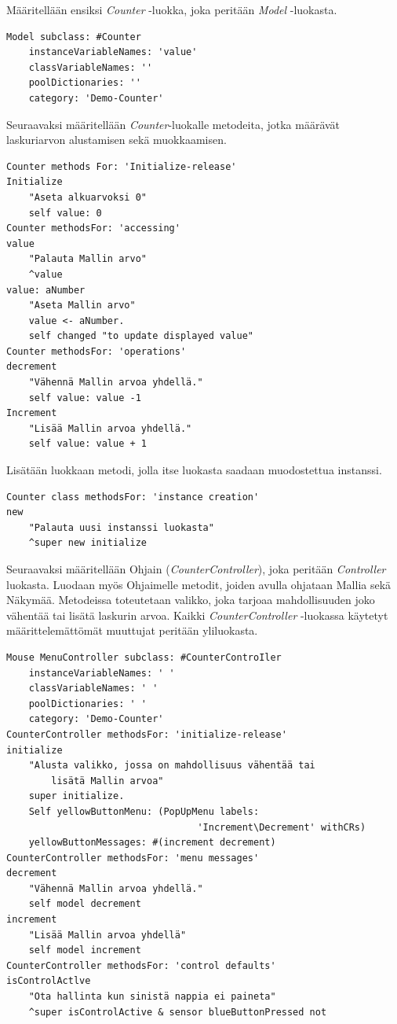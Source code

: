 \documentclass[utf8]{gradu3}
\begin{document}
Määritellään ensiksi \emph{Counter} -luokka, joka peritään \emph{Model} -luokasta.
\begin{lstlisting}[language=Smalltalk]
Model subclass: #Counter
	instanceVariableNames: 'value'
	classVariableNames: ''
	poolDictionaries: ''
  	category: 'Demo-Counter'
\end{lstlisting}
Seuraavaksi määritellään \emph{Counter}-luokalle metodeita, jotka määrävät
laskuriarvon alustamisen sekä muokkaamisen.
\begin{lstlisting}[language=Smalltalk]
Counter methods For: 'Initialize-release'
Initialize
	"Aseta alkuarvoksi 0"
	self value: 0
Counter methodsFor: 'accessing'
value
	"Palauta Mallin arvo"
   	^value
value: aNumber
	"Aseta Mallin arvo"
	value <- aNumber.
	self changed "to update displayed value"
Counter methodsFor: 'operations'
decrement
	"Vähennä Mallin arvoa yhdellä."
	self value: value -1
Increment
	"Lisää Mallin arvoa yhdellä."
	self value: value + 1
\end{lstlisting}
Lisätään luokkaan metodi, jolla itse luokasta saadaan muodostettua instanssi.
\begin{lstlisting}[language=Smalltalk]
Counter class methodsFor: 'instance creation'
new
	"Palauta uusi instanssi luokasta"
	^super new initialize
\end{lstlisting}
Seuraavaksi määritellään Ohjain (\emph{CounterController}), joka peritään
\emph{Controller} luokasta. Luodaan myös Ohjaimelle metodit, joiden avulla
ohjataan Mallia sekä Näkymää. Metodeissa toteutetaan valikko, joka tarjoaa
mahdollisuuden joko vähentää tai lisätä laskurin arvoa. Kaikki \emph{CounterController} -luokassa käytetyt
määrittelemättömät muuttujat peritään yliluokasta.
\begin{lstlisting}[language=Smalltalk]
Mouse MenuController subclass: #CounterControIler
	instanceVariableNames: ' '
  	classVariableNames: ' '
  	poolDictionaries: ' '
  	category: 'Demo-Counter'
CounterController methodsFor: 'initialize-release'
initialize
	"Alusta valikko, jossa on mahdollisuus vähentää tai 
        lisätä Mallin arvoa"
  	super initialize.
  	Self yellowButtonMenu: (PopUpMenu labels: 
                                  'Increment\Decrement' withCRs)
  	yellowButtonMessages: #(increment decrement)
CounterController methodsFor: 'menu messages'
decrement
	"Vähennä Mallin arvoa yhdellä."
 	self model decrement
increment
	"Lisää Mallin arvoa yhdellä"
	self model increment
CounterController methodsFor: 'control defaults'
isControlActlve
	"Ota hallinta kun sinistä nappia ei paineta"
	^super isControlActive & sensor blueButtonPressed not
\end{lstlisting}
\end{document}
